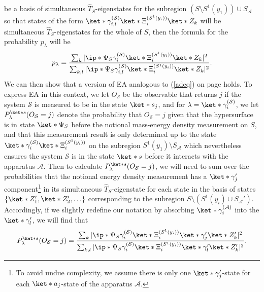 \documentclass[12pt]{report}
\begin{document}
  be a basis of simultaneous $\hat{T}_S$-eigenstates for the subregion $(S\setminus S^1(y_1))\cup S_{\mathcal{A}}$ so that states of the form $\ket*{\gamma_{i,l}^{(\mathcal{S})}}\ket*{\Xi_i^{(S^1(y_i))}}\ket*{Z_k}$ will be simultaneous $\hat{T}_S$-eigenstates for the whole of $S$, then the formula for the probability $p_\lambda$ will be 
\begin{equation}\label{plambda}
p_{\lambda}=\frac{\sum_k |\ip*{\Psi_S}{\gamma_i^{(\mathcal{S})}}\ket*{\Xi_i^{(S^1(y_i))}}\ket*{Z_k}|^2}{\sum_{k,l} |\ip*{\Psi_S}{\gamma_{i,l}^{(\mathcal{S})}}\ket*{\Xi_i^{(S^1(y_i))}}\ket*{Z_k}|^2}.
\end{equation}
We can then show that a version of EA analogous to (\ref{adeq}) on page \pageref{adeq} holds. To express EA in this context, we let
$O_{\mathcal{S}}$ %
%
 be the observable that returns $j$ if the system $\mathcal{S}$ is measured to be in the state $\ket*{s_j}$, and for $\lambda = \ket*{\gamma_i^{(\mathcal{S})}}$, we let $P_\lambda^{\ket*{s}}(O_{\mathcal{S}}=j)$ denote the probability that $O_{\mathcal{S}}=j$ given that the hypersurface is in state $\ket*{\Psi_S}$ before the notional mass-energy density measurement on $S$, and that this measurement result is only determined up to the state $\ket*{\gamma_i^{(\mathcal{S})}}\ket*{\Xi_i^{(S^1(y_i))}}$ on the subregion $S^1(y_1)\setminus S_{\mathcal{A}}$ which nevertheless ensures the system $\mathcal{S}$ is in the  state $\ket*{s}$ before it interacts with the apparatus $\mathcal{A}$. Then to calculate $P_\lambda^{\ket*{s}}(O_{\mathcal{S}}=j)$, we will need to sum over the probabilities that the notional energy density measurement has a $\ket*{\gamma_j'}$ component\footnote{To avoid undue complexity, we assume there is only one $\ket*{\gamma_j'}$-state for each $\ket*{a_j}$-state of the apparatus $\mathcal{A}$.} in its simultaneous $\hat{T}_S$-eigenstate for each state in the basis of states  $\{\ket*{Z_1'},\ket*{Z_2'},\ldots\}$ %
  corresponding to the subregion $S\setminus(S^{1}(y_i)\cup S_{\mathcal{A}}')$. Accordingly, if we slightly redefine our notation by absorbing $\ket*{\gamma_i^{(\mathcal{A})}}$ into the $\ket*{\gamma_l'}$, we will find that   
$$P_\lambda^{\ket*{s}}(O_{\mathcal{S}}=j)=\frac{\sum_k|\ip*{\Psi_S}{\gamma_i^{(\mathcal{S})}}\ket*{\Xi_i^{(S^1(y_i))}}\ket*{\gamma_j'}\ket*{Z_k'}|^2}{\sum_{k,l}|\ip*{\Psi_S}{\gamma_i^{(\mathcal{S})}}\ket*{\Xi_i^{(S^1(y_i))}}\ket*{\gamma_l'}\ket*{Z_k'}|^2}.$$ 
\end{document}
